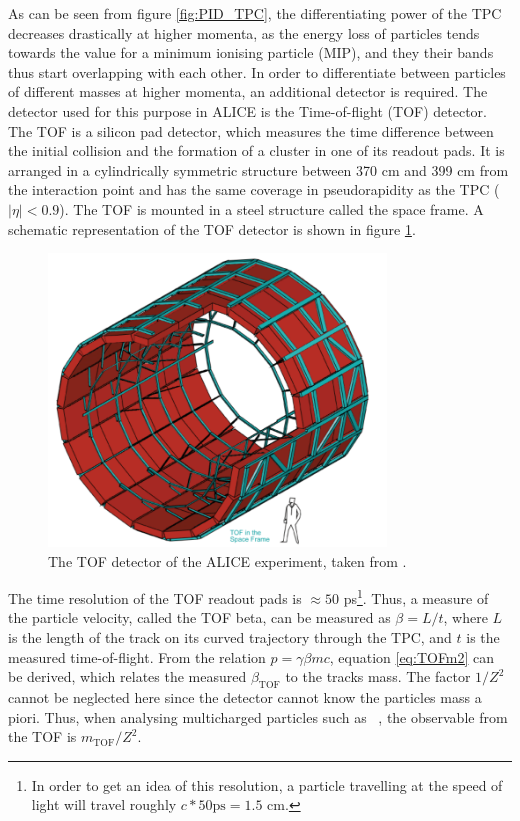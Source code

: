 As can be seen from figure \ref{fig:PID_TPC}, the differentiating power of the TPC decreases drastically at higher momenta, as the energy loss of particles tends towards the value for a minimum ionising particle (MIP), and they their bands thus start overlapping with each other. In order to differentiate between particles of different masses at higher momenta, an additional detector is required. The detector used for this purpose in ALICE is the Time-of-flight (TOF) detector. The TOF is a silicon pad detector, which measures the time difference between the initial collision and the formation of a cluster in one of its readout pads. It is arranged in a cylindrically symmetric structure between 370 cm and 399 cm from the interaction point and has the same coverage in pseudorapidity as the TPC ($|\eta| < 0.9$). The TOF is mounted in a steel structure called the space frame\cite{ALICE_TOF_TDR, ALICE_TDR}. A schematic representation of the TOF detector is shown in figure \ref{fig:TOF_schematic}. 

\begin{figure}
    \centering
    \includegraphics[width=0.8\textwidth]{figures/TOF.png}
    \caption{The TOF detector of the ALICE experiment, taken from \cite{}.}
    \label{fig:TOF_schematic}
\end{figure}

The time resolution of the TOF readout pads is $\approx 50$ ps\footnote{In order to get an idea of this resolution, a particle travelling at the speed of light will travel roughly $c*50 \mathrm{ps} = 1.5$ cm.}.
Thus, a measure of the particle velocity, called the TOF beta, can be measured as $\beta = L/t$, where $L$ is the length of the track on its curved trajectory through the TPC, and $t$ is the measured time-of-flight. From the relation $p = \gamma \beta mc$, equation \ref{eq:TOFm2} can be derived, which relates the measured $\beta_{\mathrm{TOF}}$ to the tracks mass. The factor $1/Z^2$ cannot be neglected here since the detector cannot know the particles mass a piori. Thus, when analysing multicharged particles such as \ahe\ , the observable from the TOF is $m_{\mathrm{TOF}}/Z^2$. 

